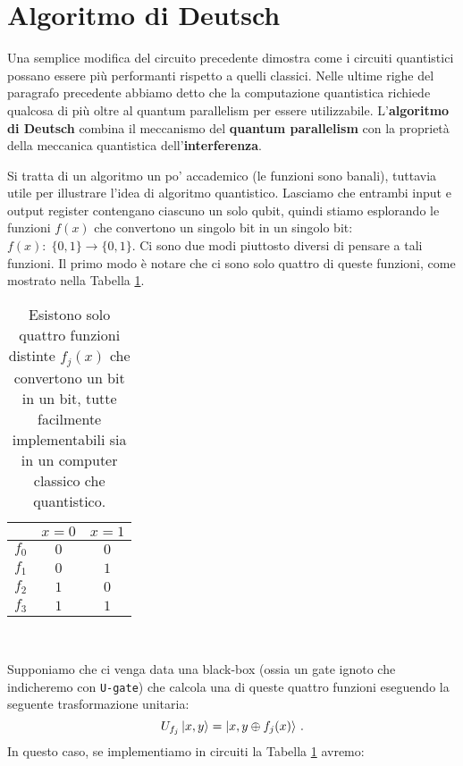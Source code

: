 \section{Algoritmo di Deutsch}
Una semplice modifica del circuito precedente dimostra come i circuiti quantistici possano essere più performanti rispetto a quelli classici. Nelle ultime righe del paragrafo precedente abbiamo detto che la computazione quantistica richiede qualcosa di più oltre al quantum parallelism per essere utilizzabile. L'\textbf{algoritmo di Deutsch} combina il meccanismo del \textbf{quantum parallelism} con la proprietà della meccanica quantistica dell'\textbf{interferenza}. 

\noindent Si tratta di un algoritmo un po' accademico (le funzioni sono banali), tuttavia utile per illustrare l'idea di algoritmo quantistico. Lasciamo che entrambi input e output register contengano ciascuno un solo qubit, quindi stiamo esplorando le funzioni $f(x)$ che convertono un singolo bit in un singolo bit: $f(x): \; \{ 0,1 \} \rightarrow \{ 0,1 \}$. Ci sono due modi piuttosto diversi di pensare a tali funzioni. Il primo modo è notare che ci sono solo quattro di queste funzioni, come mostrato nella Tabella \ref{tab:Deutsch_Fnct}.

\begin{table}[!ht]
	\centering
    \begin{tabular}{ccc}
        \toprule
        & $x = 0$ & $x=1$ \\
        \midrule
        $f_0$ & $0$ & $0$ \\
        $f_1$ & $0$ & $1$ \\
        $f_2$ & $1$ & $0$ \\
        $f_3$ & $1$ & $1$ \\
        \bottomrule
    \end{tabular} \\
    \caption{Esistono solo quattro funzioni distinte $f_j(x)$ che convertono un bit in un bit, tutte facilmente implementabili sia in un computer classico che quantistico.}
    \label{tab:Deutsch_Fnct}
\end{table}

\noindent Supponiamo che ci venga data una black-box (ossia un gate ignoto che indicheremo con \texttt{U-gate}) che calcola una di queste quattro funzioni eseguendo la seguente trasformazione unitaria:
\begin{equation*}
    U_{f_j} \ket{x,y} = \ket{x, y \oplus f_j(x)} \, .
\end{equation*}
In questo caso, se implementiamo in circuiti la Tabella \ref{tab:Deutsch_Fnct} avremo:

